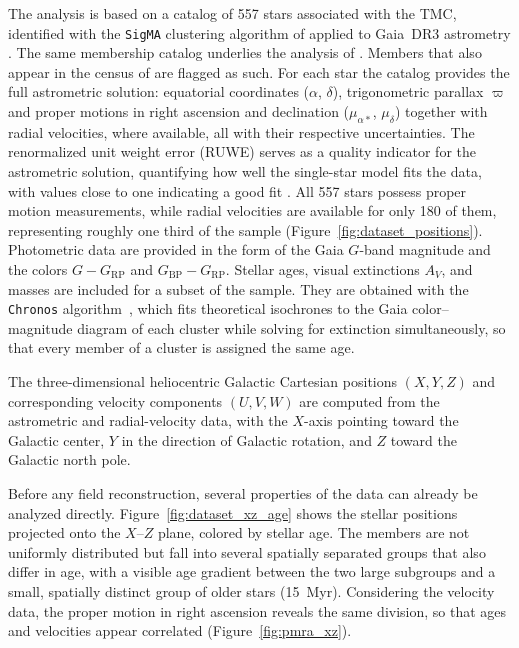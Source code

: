 The analysis is based on a catalog of 557 stars associated with the TMC,
identified with the \texttt{SigMA} clustering algorithm of
\citet{Ratzenboeck2023a_SigMA} applied to Gaia~DR3 astrometry \citep{GaiaCollaboration2023}.
The same membership catalog underlies the analysis of \citet{Alves2026}.
Members that also appear in the census of \citet{Luhman2023} are flagged as such.
For each star the catalog provides the full astrometric solution: equatorial
coordinates ($\alpha$, $\delta$), trigonometric parallax $\varpi$ and proper motions in
right ascension and declination ($\mu_{\alpha*}$, $\mu_\delta$) together with radial
velocities, where available, all with their respective uncertainties. The renormalized
unit weight error (RUWE) serves as a quality indicator for the astrometric solution,
quantifying how well the single-star model fits the data, with values close to one
indicating a good fit \citep{Pearce2022RUWE}.
All 557 stars possess proper motion measurements, while radial velocities are available
for only 180 of them, representing roughly one third of the sample
(Figure~\ref{fig:dataset_positions}). Photometric data are provided in the form of the
Gaia $G$-band magnitude and the colors $G-G_\mathrm{RP}$ and $G_\mathrm{BP}-G_\mathrm{RP}$.
Stellar ages, visual extinctions $A_V$, and masses are included for a subset of the
sample. They are obtained with the \texttt{Chronos} algorithm~\citep{Ratzenboeck2023b_Chronos},
which fits theoretical isochrones to the Gaia
color--magnitude diagram of each cluster while solving for extinction simultaneously,
so that every member of a cluster is assigned the same age.

The three-dimensional heliocentric Galactic Cartesian positions $(X, Y, Z)$ and
corresponding velocity components $(U, V, W)$ are computed from the astrometric and
radial-velocity data, with the $X$-axis pointing toward the Galactic center, $Y$ in the
direction of Galactic rotation, and $Z$ toward the Galactic north pole.

Before any field reconstruction, several properties of the data can already be analyzed
directly. Figure~\ref{fig:dataset_xz_age} shows the
stellar positions projected onto the $X$--$Z$ plane, colored by stellar age. The members are
not uniformly distributed but fall into several spatially separated groups that also differ in
age, with a visible age gradient between the two large subgroups and a small, spatially distinct
group of older stars (15~Myr).
Considering the velocity data, the proper motion in right ascension reveals the same division, so
that ages and velocities appear correlated (Figure~\ref{fig:pmra_xz}).


